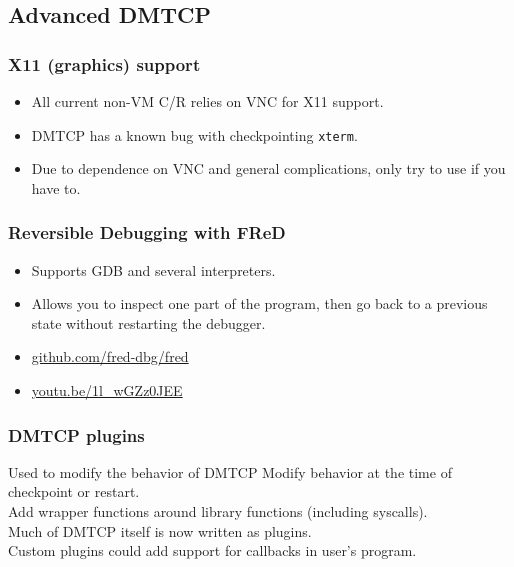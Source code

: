 \documentclass[compress]{beamer}
\begin{document}

\subsection{Advanced DMTCP}   %

\begin{frame}
\frametitle{X11 (graphics) support}

\begin{itemize}
\item All current non-VM C/R relies on VNC for X11 support.
\item DMTCP has a known bug with checkpointing \texttt{xterm}.
\item Due to dependence on VNC and general complications, only
try to use if you have to.
\end{itemize}

\end{frame}



\begin{frame}
\frametitle{Reversible Debugging with FReD}

\begin{itemize}
\item Supports GDB and several interpreters.
\item Allows you to inspect one part of the program, then
go back to a previous state without restarting the debugger.
\item \url{github.com/fred-dbg/fred}
\item \url{youtu.be/1l_wGZz0JEE}
\end{itemize}

\end{frame}


\begin{frame}
\frametitle{DMTCP plugins}

\begin{block}{Used to modify the behavior of DMTCP}
Modify behavior at the time of checkpoint or restart.\\
\vspace{1ex}
Add wrapper functions around library functions (including syscalls).\\ 
\vspace{1ex}
Much of DMTCP itself is now written as plugins.\\
\vspace{1ex}
Custom plugins could add support for callbacks in user's program.\\
\end{block}

\end{frame}
\end{document}
